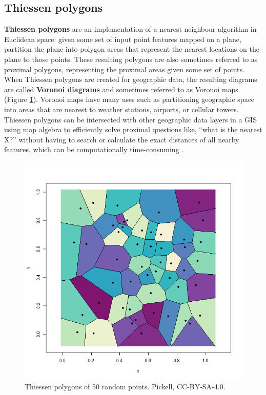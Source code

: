 \documentclass[
]{book}
\begin{document}
\subsection{Thiessen polygons}\label{thiessen-polygons}

\textbf{Thiessen polygons} are an implementation of a nearest neighbour algorithm in Euclidean space: given some set of input point features mapped on a plane, partition the plane into polygon areas that represent the nearest locations on the plane to those points. These resulting polygons are also sometimes referred to as proximal polygons, representing the proximal areas given some set of points. When Thiessen polygons are created for geographic data, the resulting diagrams are called \textbf{Voronoi diagrams} and sometimes referred to as Voronoi maps (Figure \ref{fig:7-2d-thiessen-polygons}). Voronoi maps have many uses such as partitioning geographic space into areas that are nearest to weather stations, airports, or cellular towers. Thiessen polygons can be intersected with other geographic data layers in a GIS using map algebra to efficiently solve proximal questions like, ``what is the nearest X?'' without having to search or calculate the exact distances of all nearby features, which can be computationally time-consuming \citep{okabe_nearest_1994}.

\begin{figure}
\includegraphics[width=0.75\linewidth]{images/07-2d-thiessen-polygons} \caption{Thiessen polygons of 50 random points. Pickell, CC-BY-SA-4.0.}\label{fig:7-2d-thiessen-polygons}
\end{figure}
\end{document}
